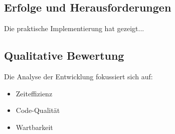 \subsection{Erfolge und Herausforderungen}
Die praktische Implementierung hat gezeigt...

\subsection{Qualitative Bewertung}
Die Analyse der Entwicklung fokussiert sich auf:
\begin{itemize}
    \item Zeiteffizienz
    \item Code-Qualität
    \item Wartbarkeit
\end{itemize} 